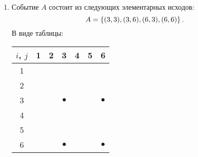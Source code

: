 \begin{enumerate}
    \item
    Событие $A$ состоит из следующих элементарных исходов:
    \begin{equation}
        A = \left \{ (3,3), (3,6), (6,3), (6,6) \right \} .
    \end{equation}
    В виде таблицы:
    \begin{center}
        \begin{tabular}{c|c|c|c|c|c|c|}
            $i$, $j$ & 1 & 2 & 3         & 4 & 5 & 6         \\
            \hline
            1        &   &   &           &   &   &           \\
            \hline
            2        &   &   &           &   &   &           \\
            \hline
            3        &   &   & $\bullet$ &   &   & $\bullet$ \\
            \hline
            4        &   &   &           &   &   &           \\
            \hline
            5        &   &   &           &   &   &           \\
            \hline
            6        &   &   & $\bullet$ &   &   & $\bullet$ \\
            \hline
        \end{tabular}
    \end{center}


\end{enumerate}
